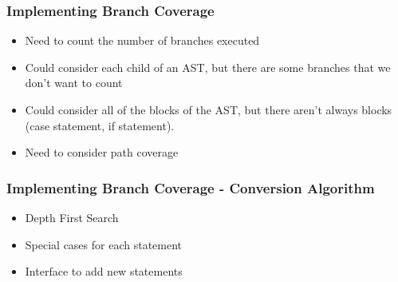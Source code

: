 \begin{frame}
\frametitle{Implementing Branch Coverage}
\begin{figure}
  \centering
\end{figure}
\begin{itemize}
\item Need to count the number of branches executed
\item Could consider each child of an AST, but there are some branches that we don't want to count
\item Could consider all of the blocks of the AST, but there aren't always blocks (case statement, if statement).
\item Need to consider path coverage
\end{itemize}

\end{frame}


\begin{frame}
\frametitle{Implementing Branch Coverage - Conversion Algorithm}
\begin{figure}
  \centering
\end{figure}
\begin{itemize}
\item Depth First Search
\item Special cases for each statement
\item Interface to add new statements
\end{itemize}
\end{frame}


